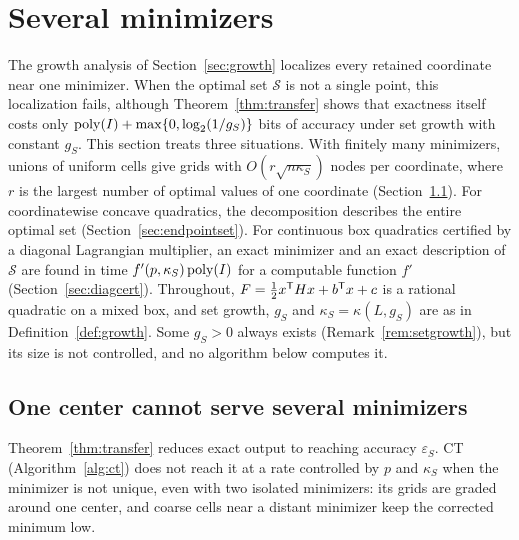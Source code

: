 \section{Several minimizers}\label{sec:optsets}
The growth analysis of Section~\ref{sec:growth} localizes every retained
coordinate near one minimizer. When the optimal set $\mathcal S$ is not a
single point, this localization fails, although Theorem~\ref{thm:transfer}
shows that exactness itself costs only $\operatorname{poly}(I)+\max\{0,\log_2(1/g_S)\}$
bits of accuracy under set growth with constant $g_S$. This section treats three
situations. With finitely many minimizers, unions of uniform cells give grids
with $O(r\sqrt{n\kappa_S})$ nodes per coordinate, where $r$ is the largest
number of optimal values of one coordinate
(Section~\ref{sec:exact-nonunique}). For coordinatewise concave quadratics,
the decomposition describes the entire optimal set
(Section~\ref{sec:endpointset}). For continuous box quadratics certified by a
diagonal Lagrangian multiplier, an exact minimizer and an exact description
of $\mathcal S$ are found in time $f'(p,\kappa_S)\operatorname{poly}(I)$ for a computable
function $f'$ (Section~\ref{sec:diagcert}). Throughout, $F=\frac12x^\mathsf T Hx+b^\mathsf T x+c$ is a
rational quadratic on a mixed box, and set growth, $g_S$ and
$\kappa_S=\kappa(L,g_S)$ are as in Definition~\ref{def:growth}. Some $g_S>0$
always exists (Remark~\ref{rem:setgrowth}), but its size is not controlled,
and no algorithm below computes it.

\subsection{One center cannot serve several minimizers}\label{sec:exact-nonunique}

Theorem~\ref{thm:transfer} reduces exact output to reaching accuracy
$\varepsilon_S$. CT (Algorithm~\ref{alg:ct}) does not reach it at a rate
controlled by $p$ and $\kappa_S$ when the minimizer is not unique, even with
two isolated minimizers: its grids are graded around one center, and coarse
cells near a distant minimizer keep the corrected minimum low.

